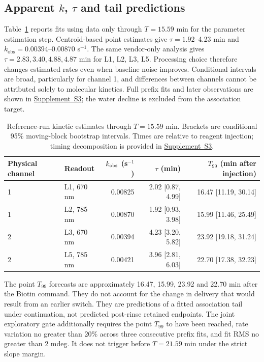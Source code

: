 \documentclass[lettersize,journal]{IEEEtran}
\newcommand{\supp}[1]{\href{SPR_smart_stop_supplement.pdf}{Supplement~#1}}
\begin{document}
\subsection{Apparent $k$, $\tau$ and tail predictions}
Table~\ref{tab:rates} reports fits using data only through $T=15.59$ min for the
parameter estimation step. Centroid-based point estimates give
$\tau=1.92$--4.23 min and $k_{\mathrm{obs}}=0.00394$--0.00870 s$^{-1}$.
The same vendor-only analysis gives $\tau=2.83,3.40,4.88,4.87$ min for
L1, L2, L3, L5. Processing choice therefore changes estimated rates even
when baseline noise improves. Conditional intervals are broad, particularly
for channel 1, and differences between channels cannot be attributed solely
to molecular kinetics. Full prefix fits and later observations are shown in \supp{S3}; the
water decline is excluded from the association target.

\begin{table}[t]\centering
\caption{Reference-run kinetic estimates through $T=15.59$ min. Brackets are
conditional 95\% moving-block bootstrap intervals. Times are relative
to reagent injection; timing decomposition is provided in \supp{S3}.}
\label{tab:rates}

\begin{tabular}{llrrr}\toprule
Physical channel & Readout & $k_{\rm obs}$ (s$^{-1}$) & $\tau$ (min) & $T_{99}$ (min after injection)\\\midrule
1 & L1, 670 nm & 0.00825 & 2.02 [0.87, 4.99] & 16.47 [11.19, 30.14]\\
1 & L2, 785 nm & 0.00870 & 1.92 [0.93, 3.98] & 15.99 [11.46, 25.49]\\
2 & L3, 670 nm & 0.00394 & 4.23 [3.20, 5.82] & 23.92 [19.18, 31.24]\\
2 & L5, 785 nm & 0.00421 & 3.96 [2.81, 6.03] & 22.70 [17.38, 32.23]\\\bottomrule
\end{tabular}

\end{table}

The point $T_{99}$ forecasts are approximately 16.47, 15.99,
23.92 and 22.70 min after the Biotin command. They do not account for the
change in delivery that would result from an earlier switch. They are
predictions of a fitted association tail under continuation, not predicted
post-rinse retained endpoints. The joint exploratory gate additionally
requires the point $T_{99}$ to have been reached, rate variation no greater
than 20\% across three consecutive prefix fits, and fit RMS no greater
than 2 mdeg. It does not trigger before $T=21.59$ min under the strict slope margin.
\end{document}
